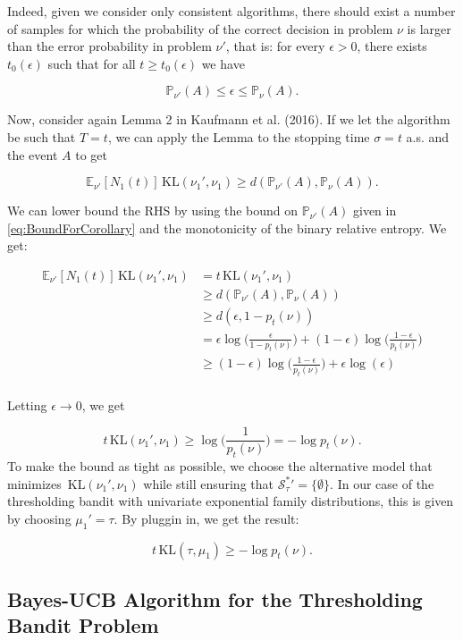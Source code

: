 \documentclass[11pt,]{article}
\newcommand{\KL}{\,\text{KL}}
\begin{document}
Indeed, given we consider only consistent algorithms, there should exist
a number of samples for which the probability of the correct decision in
problem \(\nu\) is larger than the error probability in problem
\(\nu'\), that is: for every \(\epsilon > 0\), there exists
\(t_0(\epsilon)\) such that for all \(t \geq t_0(\epsilon)\) we have

\begin{equation}
\mathbb{P}_{\nu'}(A) \leq \epsilon \leq \mathbb{P}_{\nu}(A). \label{eq:BoundForCorollary}
\end{equation}

Now, consider again Lemma 2 in Kaufmann et al. (2016). If we let the
algorithm be such that \(T = t\), we can apply the Lemma to the stopping
time \(\sigma = t\) a.s. and the event \(A\) to get

\[
\mathbb{E}_{\nu'}[N_1(t)]\KL(\nu_1', \nu_1) \geq d(\mathbb{P}_{\nu'}(A), \mathbb{P}_{\nu}(A)).
\]

We can lower bound the RHS by using the bound on
\(\mathbb{P}_{\nu'}(A)\) given in \eqref{eq:BoundForCorollary} and the
monotonicity of the binary relative entropy. We get:

\begin{align*}
\mathbb{E}_{\nu'}[N_1(t)]\KL(\nu_1', \nu_1) & = t \KL(\nu_1', \nu_1) \\
& \geq d(\mathbb{P}_{\nu'}(A), \mathbb{P}_{\nu}(A)) \\
& \geq d(\epsilon, 1- p_t(\nu)) \\
& = \epsilon \log\Big(\frac{\epsilon}{1-p_t(\nu)}\Big) + (1-\epsilon) \log \Big(\frac{1-\epsilon}{p_t(\nu)}\Big) \\
& \geq (1-\epsilon) \log \Big(\frac{1-\epsilon}{p_t(\nu)}\Big) + \epsilon \log(\epsilon) \\
\end{align*}

Letting \(\epsilon \rightarrow 0\), we get

\[
t \KL(\nu_1', \nu_1) \geq \log \Big(\frac{1}{p_t(\nu)}\Big) = -\log p_t(\nu).
\] To make the bound as tight as possible, we choose the alternative
model that minimizes \(\KL(\nu_1', \nu_1)\) while still ensuring that
\(\mathcal{S}_{\tau}^* {'} = \{\emptyset\}\). In our case of the
thresholding bandit with univariate exponential family distributions,
this is given by choosing \(\mu_1' = \tau\). By pluggin in, we get the
result:

\[
t \KL(\tau, \mu_1) \geq -\log p_t(\nu).
\]

\subsection{\texorpdfstring{Bayes-UCB Algorithm for the Thresholding
Bandit Problem
\label{sec:AppendixBUCB}}{Bayes-UCB Algorithm for the Thresholding Bandit Problem }}\label{bayes-ucb-algorithm-for-the-thresholding-bandit-problem}
\end{document}
